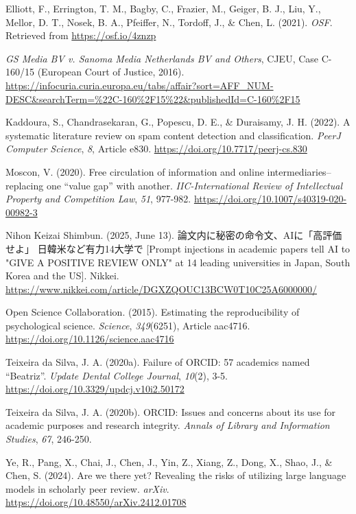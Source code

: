 \documentclass[authordate, meta]{jote-new-article}
\begin{document}
	Elliott, F., Errington, T. M., Bagby, C., Frazier, M., Geiger, B. J., Liu, Y., Mellor, D. T., Nosek, B. A., Pfeiffer, N., Tordoff, J., \& Chen, L. (2021). \emph{OSF}. Retrieved from \url{https://osf.io/4znzp}



	\emph{GS Media BV v. Sanoma Media Netherlands BV and Others}, CJEU, Case C-160/15 (European Court of Justice, 2016). \url{https://infocuria.curia.europa.eu/tabs/affair?sort=AFF_NUM-DESC&searchTerm=%22C-160%2F15%22&publishedId=C-160%2F15}


	Kaddoura, S., Chandrasekaran, G., Popescu, D. E., \& Duraisamy, J. H. (2022). A systematic literature review on spam content detection and classification. \emph{PeerJ Computer Science}, \emph{8}, Article e830. \url{https://doi.org/10.7717/peerj-cs.830}



	Moscon, V. (2020). Free circulation of information and online intermediaries--replacing one “value gap” with another. \emph{IIC-International Review of Intellectual Property and Competition Law}, \emph{51}, 977-982. \url{https://doi.org/10.1007/s40319-020-00982-3}



	Nihon Keizai Shimbun. (2025, June 13). {\japanesefont 論文内に秘密の命令文、AIに「高評価せよ」 日韓米など有力14大学で} [Prompt injections in academic papers tell AI to "GIVE A POSITIVE REVIEW ONLY" at 14 leading universities in Japan, South Korea and the US]. Nikkei. \url{https://www.nikkei.com/article/DGXZQOUC13BCW0T10C25A6000000/}



	Open Science Collaboration. (2015). Estimating the reproducibility of psychological science. \emph{Science}, \emph{349}(6251), Article aac4716. \url{https://doi.org/10.1126/science.aac4716}



	Teixeira da Silva, J. A. (2020a). Failure of ORCID: 57 academics named “Beatriz”. \emph{Update Dental College Journal}, \emph{10}(2), 3-5. \url{https://doi.org/10.3329/updcj.v10i2.50172}



	Teixeira da Silva, J. A. (2020b). ORCID: Issues and concerns about its use for academic purposes and research integrity. \emph{Annals of Library and Information Studies}, \emph{67}, 246-250.



	Ye, R., Pang, X., Chai, J., Chen, J., Yin, Z., Xiang, Z., Dong, X., Shao, J., \& Chen, S. (2024). Are we there yet? Revealing the risks of utilizing large language models in scholarly peer review. \emph{arXiv}. \url{https://doi.org/10.48550/arXiv.2412.01708}
\end{document}
